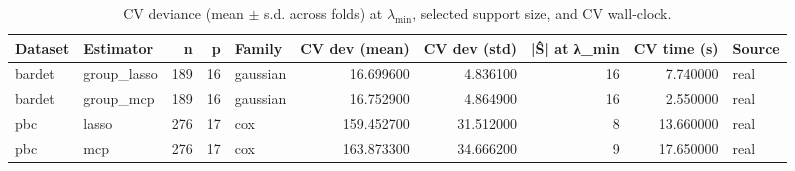 \begin{table}[t]
  \centering
  \caption{CV deviance (mean $\pm$ s.d. across folds) at $\lambda_{\min}$, selected support size, and CV wall-clock.}
  \label{tab:realdata}
\begin{tabular}{llrrlrrrrl}
\toprule
Dataset & Estimator & n & p & Family & CV dev (mean) & CV dev (std) & |Ŝ| at λ_min & CV time (s) & Source \\
\midrule
bardet & group_lasso & 189 & 16 & gaussian & 16.699600 & 4.836100 & 16 & 7.740000 & real \\
bardet & group_mcp & 189 & 16 & gaussian & 16.752900 & 4.864900 & 16 & 2.550000 & real \\
pbc & lasso & 276 & 17 & cox & 159.452700 & 31.512000 & 8 & 13.660000 & real \\
pbc & mcp & 276 & 17 & cox & 163.873300 & 34.666200 & 9 & 17.650000 & real \\
\bottomrule
\end{tabular}
\end{table}
